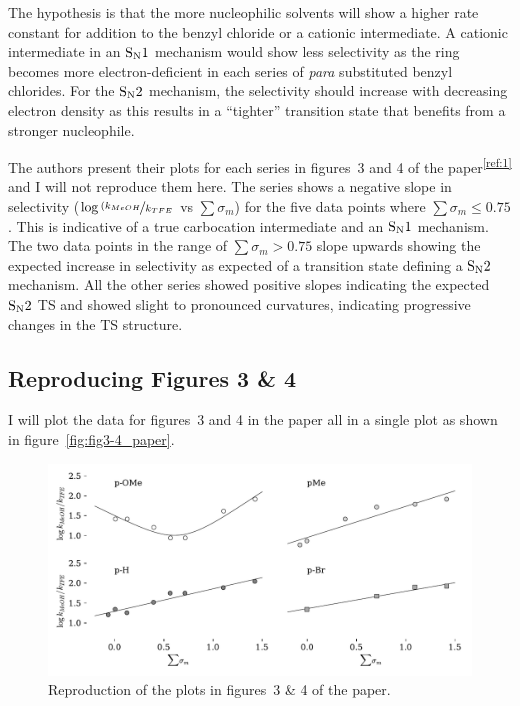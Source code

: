\documentclass{tufte-handout}
\newcommand{\tss}[1]{\textsuperscript{#1}}
\begin{document}
The hypothesis is that the more nucleophilic solvents will show a higher rate constant for addition to the benzyl chloride or a cationic intermediate. A cationic intermediate in an $\rm S_N1$ mechanism would show less selectivity as the ring becomes more electron-deficient in each series of \textit{para} substituted benzyl chlorides. For the $\rm S_N2$ mechanism, the selectivity should increase with decreasing electron density as this results in a ``tighter'' transition state that benefits from a stronger nucleophile. 

The authors present their plots for each series in figures~3 and 4 of the paper\tss{\ref{ref:1}} and I will not reproduce them here. The  series shows a negative slope in selectivity ($\log{\nicefrac{(k_{MeOH}}{k_{TFE}}}$ vs $\sum \sigma_m$) for the five data points where $\sum \sigma_m \le 0.75$. This is indicative of a true carbocation intermediate and an $\rm S_N1$ mechanism. The two data points in the range of $\sum \sigma_m > 0.75$ slope upwards showing the expected increase in selectivity as expected of a transition state defining a $\rm S_N2$ mechanism. All the other series showed positive slopes indicating the expected $\rm S_N2$ TS and showed slight to pronounced curvatures, indicating progressive changes in the TS structure.

\subsection{Reproducing Figures 3 \& 4}

I will plot the data for figures~3 and 4 in the paper all in a single plot as shown in figure~\vref{fig:fig3-4_paper}. 

\begin{figure}[h!]
  \centering
  \includegraphics[scale=0.8]{images/plot6.pdf}
  \caption[-0mm]{Reproduction of the plots in figures~3 \& 4 of the paper.   \vspace{2mm} \\
 } 
  \label{fig:fig3-4_paper}
\end{figure}
\end{document}
